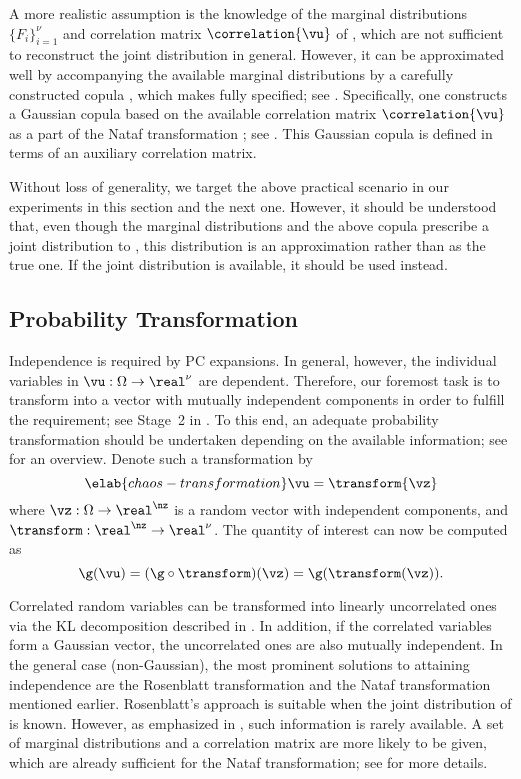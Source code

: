A more realistic assumption is the knowledge of the marginal distributions $\{
F_i \}_{i = 1}^\nu$ and correlation matrix $\correlation{\vu}$ of \vu, which are
not sufficient to reconstruct the joint distribution in general. However, it can
be approximated well by accompanying the available marginal distributions by a
carefully constructed copula \cite{nelsen2006}, which makes \vu fully specified;
see . Specifically, one constructs a Gaussian copula
based on the available correlation matrix $\correlation{\vu}$ as a part of the
Nataf transformation \cite{liu1986}; see . This
Gaussian copula is defined in terms of an auxiliary correlation matrix.

Without loss of generality, we target the above practical scenario in our
experiments in this section and the next one. However, it should be understood
that, even though the marginal distributions and the above copula prescribe a
joint distribution to \vu, this distribution is an approximation rather than as
the true one. If the joint distribution is available, it should be used instead.

\subsection{Probability Transformation}

Independence is required by \ac{PC} expansions. In general, however, the
individual variables in $\vu: \Omega \to \real^\nu$ are dependent. Therefore,
our foremost task is to transform \vu into a vector with mutually independent
components in order to fulfill the requirement; see Stage~2 in
. To this end, an adequate probability transformation
should be undertaken depending on the available information; see
\cite{eldred2008} for an overview. Denote such a transformation by
\begin{equation} \elab{chaos-transformation}
  \vu = \transform{\vz}
\end{equation}
where $\vz: \Omega \to \real^\nz$ is a random vector with \nz independent
components, and $\transform: \real^\nz \to \real^\nu$. The quantity of interest
\g can now be computed as
\[
  \g(\vu) = (\g \circ \transform)(\vz) = \g(\transform(\vz)).
\]

Correlated random variables can be transformed into linearly uncorrelated ones
via the \ac{KL} decomposition described in . In addition,
if the correlated variables form a Gaussian vector, the uncorrelated ones are
also mutually independent. In the general case (non-Gaussian), the most
prominent solutions to attaining independence are the Rosenblatt transformation
\cite{rosenblatt1952} and the Nataf transformation mentioned earlier.
Rosenblatt's approach is suitable when the joint distribution of \vu is known.
However, as emphasized in , such information is rarely
available. A set of marginal distributions and a correlation matrix are more
likely to be given, which are already sufficient for the Nataf transformation;
see  for more details.

